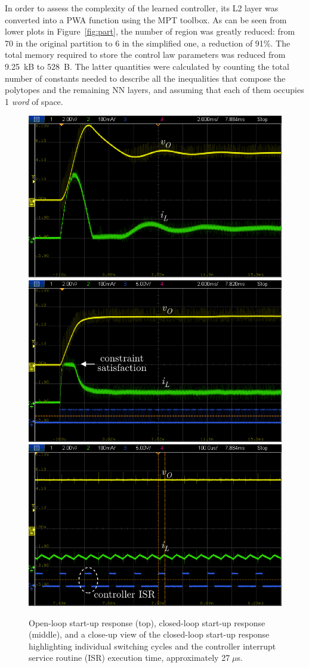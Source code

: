 In order to assess the complexity of the learned controller, its L2 layer was converted into a PWA function using the MPT toolbox. As can be seen from lower plots in Figure~\ref{fig:part}, the number of region was greatly reduced: from 70 in the original partition to 6 in the simplified one, a reduction of 91\%. The total memory required to store the control law parameters was reduced from 9.25~kB to 528~B. The latter quantities were calculated by counting the total number of constants needed to describe all the inequalities that compose the polytopes and the remaining NN layers, and assuming that each of them occupies 1 \textit{word} of space.

\pagebreak

\begin{figure}[p] 
	\vspace*{25pt}
	\centering
	\includegraphics[width=0.65\linewidth]{../images/chap4_scope_ol} \\[10pt]
	\includegraphics[width=0.65\linewidth]{../images/chap4_scope_cl1} \\[10pt]
	\includegraphics[width=0.65\linewidth]{../images/chap4_scope_cl2}
	\caption{Open-loop start-up response (top), closed-loop start-up response (middle), and a close-up view of the closed-loop start-up response highlighting individual switching cycles and the controller interrupt service routine (ISR) execution time, approximately 27$\;\mu$s.}
	\label{fig.asd}
\end{figure}

\clearpage